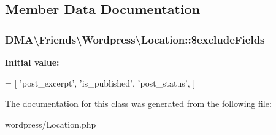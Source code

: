 \subsection{Member Data Documentation}
\hypertarget{classDMA_1_1Friends_1_1Wordpress_1_1Location_ae18a475210d12a42d335d6ca6fb47811}{
\subsubsection[{\$exclude\-Fields}]{\setlength{\rightskip}{0pt plus 5cm}D\-M\-A\textbackslash{}\-Friends\textbackslash{}\-Wordpress\textbackslash{}\-Location\-::\$exclude\-Fields\hspace{0.3cm}{\ttfamily [protected]}}}\label{classDMA_1_1Friends_1_1Wordpress_1_1Location_ae18a475210d12a42d335d6ca6fb47811}
{\bfseries Initial value\-:}
\begin{DoxyCode}
= [
        \textcolor{stringliteral}{'post\_excerpt'},
        \textcolor{stringliteral}{'is\_published'},
        \textcolor{stringliteral}{'post\_status'},
    ]
\end{DoxyCode}


The documentation for this class was generated from the following file\-:\begin{DoxyCompactItemize}
\item 
wordpress/Location.\-php\end{DoxyCompactItemize}
